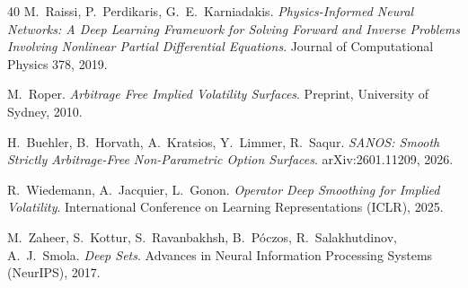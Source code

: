 \begin{thebibliography}{40}
 M.~Raissi, P.~Perdikaris, G.~E.~Karniadakis.
\emph{Physics-Informed Neural Networks: A Deep Learning Framework for Solving Forward and
Inverse Problems Involving Nonlinear Partial Differential Equations}. Journal of Computational
Physics 378, 2019.

 M.~Roper.
\emph{Arbitrage Free Implied Volatility Surfaces}. Preprint, University of Sydney, 2010.

 H.~Buehler, B.~Horvath, A.~Kratsios, Y.~Limmer, R.~Saqur.
\emph{SANOS: Smooth Strictly Arbitrage-Free Non-Parametric Option Surfaces}. arXiv:2601.11209,
2026.

 R.~Wiedemann, A.~Jacquier, L.~Gonon.
\emph{Operator Deep Smoothing for Implied Volatility}. International Conference on Learning
Representations (ICLR), 2025.

 M.~Zaheer, S.~Kottur, S.~Ravanbakhsh, B.~P\'oczos, R.~Salakhutdinov,
A.~J.~Smola. \emph{Deep Sets}. Advances in Neural Information Processing Systems (NeurIPS), 2017.

\end{thebibliography}